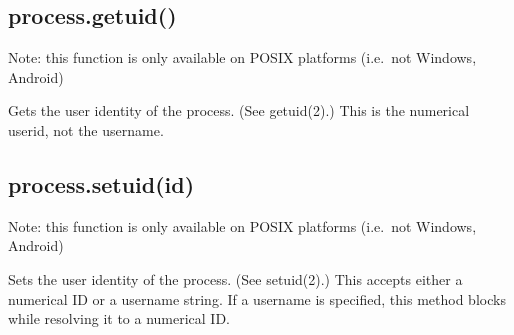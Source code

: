 \begin{Shaded}
\begin{Highlighting}[]
 \NormalTok{(} \NormalTok{&& }\NormalTok{) \{}
  \NormalTok{(} \NormalTok{+ }\NormalTok{());}
   \NormalTok{\{}
    \NormalTok{(}\NormalTok{);}
    \NormalTok{(} \NormalTok{+ }\NormalTok{());}
  \NormalTok{\}}
   
    \NormalTok{(} 
  \NormalTok{\}}
\NormalTok{\}}
\end{Highlighting}
\end{Shaded}

\subsection{process.getuid()}\label{process.getuid}

Note: this function is only available on POSIX platforms (i.e.~not
Windows, Android)

Gets the user identity of the process. (See getuid(2).) This is the
numerical userid, not the username.

\begin{Shaded}
\begin{Highlighting}[]
 \NormalTok{(}\NormalTok{) \{}
  \NormalTok{(} \NormalTok{+ }\NormalTok{());}
\NormalTok{\}}
\end{Highlighting}
\end{Shaded}

\subsection{process.setuid(id)}\label{process.setuidid}

Note: this function is only available on POSIX platforms (i.e.~not
Windows, Android)

Sets the user identity of the process. (See setuid(2).) This accepts
either a numerical ID or a username string. If a username is specified,
this method blocks while resolving it to a numerical ID.

